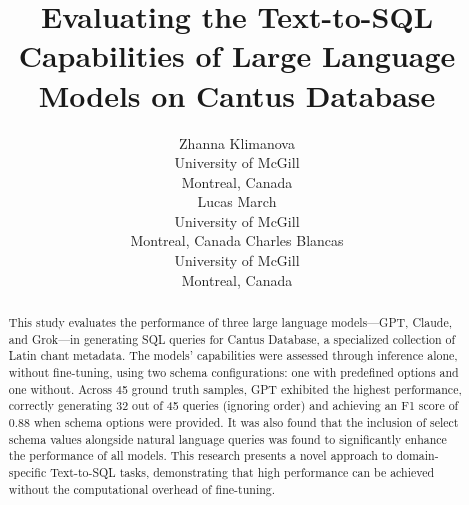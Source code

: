 \documentclass[11pt]{article}
\title{Evaluating the Text-to-SQL Capabilities of Large Language Models on Cantus Database}
\author{ Zhanna Klimanova\\
  University of McGill \\
  Montreal, Canada \\ \And
  Lucas March \\
  University of McGill \\
  Montreal, Canada \And
  Charles Blancas \\
  University of McGill \\
  Montreal, Canada \\}
\begin{document}
\maketitle

\begin{abstract}


This study evaluates the performance of three large language models—GPT, Claude, and Grok—in generating SQL queries for Cantus Database, a specialized collection of Latin chant metadata. The models' capabilities were assessed through inference alone, without fine-tuning, using two schema configurations: one with predefined options and one without. Across 45 ground truth samples, GPT exhibited the highest performance, correctly generating 32 out of 45 queries (ignoring order) and achieving an F1 score of 0.88 when schema options were provided. It was also found that the inclusion of select schema values alongside natural language queries was found to significantly enhance the performance of all models. This research presents a novel approach to domain-specific Text-to-SQL tasks, demonstrating that high performance can be achieved without the computational overhead of fine-tuning.


\end{abstract}








\pagebreak


\nocite{python, postgresql, django, cantusdb, docker, json}


\end{document}

